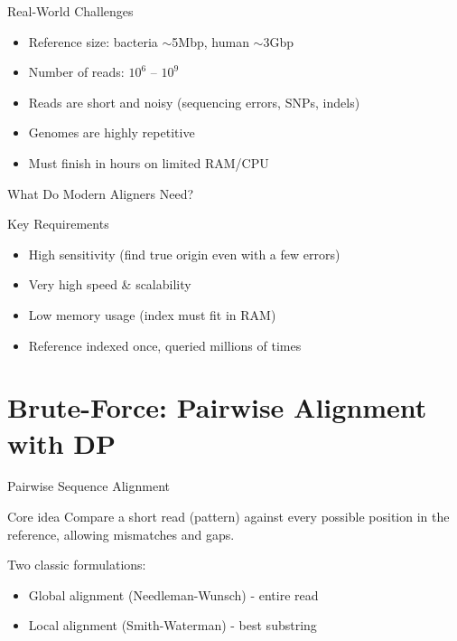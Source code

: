\documentclass[
11pt, %
aspectratio=169, %
]{beamer}
\begin{document}
\begin{frame}{Real-World Challenges}
\begin{itemize}
\item Reference size: bacteria $\sim$5Mbp, human $\sim$3Gbp
\item Number of reads: $10^6$ -- $10^9$
\item Reads are short and noisy (sequencing errors, SNPs, indels)
\item Genomes are highly repetitive
\item Must finish in hours on limited RAM/CPU
\end{itemize}
\end{frame}

\begin{frame}{What Do Modern Aligners Need?}
\begin{block}{Key Requirements}
\begin{itemize}
\item High sensitivity (find true origin even with a few errors)
\item Very high speed \& scalability
\item Low memory usage (index must fit in RAM)
\item Reference indexed once, queried millions of times
\end{itemize}
\end{block}
\end{frame}


\section{Brute-Force: Pairwise Alignment with DP}
\begin{frame}{Pairwise Sequence Alignment}
\begin{block}{Core idea}
Compare a short read (pattern) against every possible position in the reference, allowing mismatches and gaps.
\end{block}
\bigskip
Two classic formulations:
\begin{itemize}
\item \alert{Global alignment} (Needleman-Wunsch) - entire read
\item \alert{Local alignment} (Smith-Waterman) - best substring
\end{itemize}
\end{frame}

\end{document}
